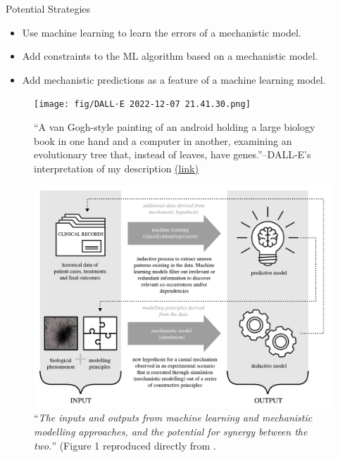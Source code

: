 \documentclass[10pt,aspectratio=169]{beamer}
\newcounter{frame}[frame]
\begin{document}
\begin{frame}{Potential Strategies}
	
	\begin{itemize}
	\item Use machine learning to learn the errors of a mechanistic model.
	\item Add constraints to the ML algorithm based on a mechanistic model.
	\item Add mechanistic predictions as a feature of a machine learning model.
	\end{itemize}

	\begin{figure}
	\centering
	\texttt{[image: fig/DALL·E 2022-12-07 21.41.30.png]}
	\caption{``A van Gogh-style painting of an android holding a large biology book in one hand and a computer in another, examining an evolutionary tree that, instead of leaves, have genes.''--DALL-E's interpretation of my description \hyperlink{https://labs.openai.com/s/s0GoDQ64OMRfMr1y6uRXtmo9}{(link)}}
\end{figure}
\end{frame}

\begin{frame}
\begin{figure}
    \centering
    \includegraphics[width=.7\linewidth]{fig/Baker et al (Biol. Lett., 2018)-fig1.pdf}
    \caption{``\textit{The inputs and outputs from machine learning and mechanistic modelling approaches, and the potential for synergy between the two.}'' (Figure 1 reproduced directly from \textcite{bakerMechanisticModelsMachine2018}.}
    \label{fig:baker}
\end{figure}
\end{frame}
\end{document}
